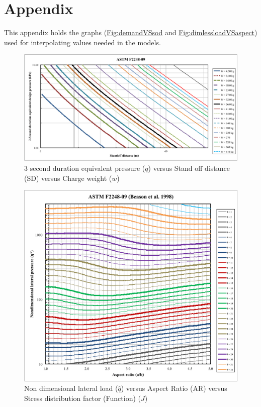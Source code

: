 \documentclass[12pt]{article}
\begin{document}
\section{Appendix}
\label{Sec:Appendix}
This appendix holds the graphs (\hyperref[Figure:demandVSsod]{Fig:demandVSsod} and \hyperref[Figure:dimlessloadVSaspect]{Fig:dimlessloadVSaspect}) used for interpolating values needed in the models.
\begin{figure}
\begin{center}
\includegraphics[width=\textwidth]{../../../datafiles/GlassBR/ASTM_F2248-09.png}
\caption{3 second duration equivalent pressure ($q$) versus Stand off distance (SD) versus Charge weight ($w$)}
\label{Figure:demandVSsod}
\end{center}
\end{figure}
\begin{figure}
\begin{center}
\includegraphics[width=\textwidth]{../../../datafiles/GlassBR/ASTM_F2248-09_BeasonEtAl.png}
\caption{Non dimensional lateral load ($\hat{q}$) versus Aspect Ratio (AR) versus Stress distribution factor (Function) ($J$)}
\label{Figure:dimlessloadVSaspect}
\end{center}
\end{figure}
\end{document}
